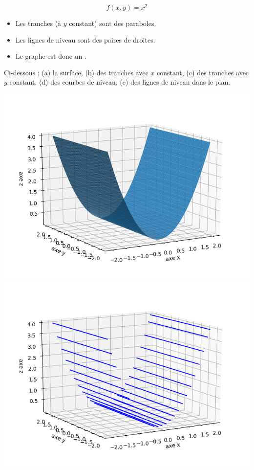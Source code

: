 \documentclass[11pt, class=report,crop=false]{standalone}
\begin{document}
\begin{exemple}
$$f(x,y) = x^2$$

\begin{itemize}
  \item Les tranches (à $y$ constant) sont des paraboles.
  \item Les lignes de niveau sont des paires de droites.
  \item Le graphe est donc un .
\end{itemize}


Ci-dessous : (a) la surface, (b) des tranches avec $x$ constant, (c) des tranches avec $y$ constant, (d) des courbes de niveau, (e) des lignes de niveau dans le plan.
\begin{center}
    \includegraphics[scale=\myscale,scale=0.5]{figures/fonctions-quadra-2a}
    \includegraphics[scale=\myscale,scale=0.5]{figures/fonctions-quadra-2b}

\end{center}
\end{exemple}
\end{document}
